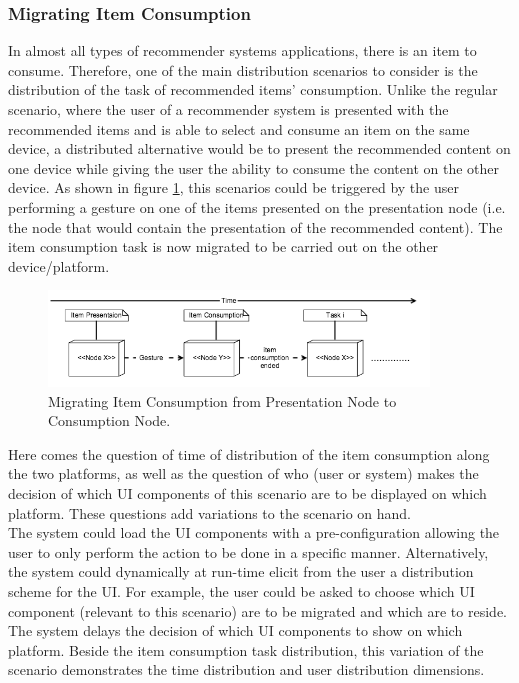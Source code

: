 \subsubsection{Migrating Item Consumption}                    
In almost all types of recommender systems applications, there is an item to consume. Therefore, one of the main distribution scenarios to consider is the distribution of the task of recommended items' consumption. Unlike the regular scenario, where the user of a recommender system is presented with the recommended items and is able to select and consume an item on the same device, a distributed alternative would be to present the recommended content on one device while giving the user the ability to consume the content on the other device. As shown in figure \ref{fig:figure31}, this scenarios could be triggered by the user performing a gesture on one of the items presented on the presentation node (i.e. the node that would contain the presentation of the recommended content). The item consumption task is now migrated to be carried out on the other device/platform. 
\begin{figure}[h]
\includegraphics[width=0.9\textwidth, inner, center]{figures/generic1}
\caption{Migrating Item Consumption from Presentation Node to Consumption Node.}
\label{fig:figure31}
\end{figure}
Here comes the question of time of distribution of the item consumption along the two platforms, as well as the question of who (user or system) makes the decision of which UI components of this scenario are to be displayed on which platform. These questions add variations to the scenario on hand.\\
The system could load the UI components with a pre-configuration allowing the user to only perform the action to be done in a specific manner. Alternatively, the system could dynamically at run-time elicit from the user a distribution scheme for the UI. For example, the user could be asked to choose which UI component (relevant to this scenario) are to be migrated and which are to reside. The system delays the decision of which UI components to show on which platform. Beside the item consumption task distribution, this variation of the scenario demonstrates the time distribution and user distribution dimensions.
      
